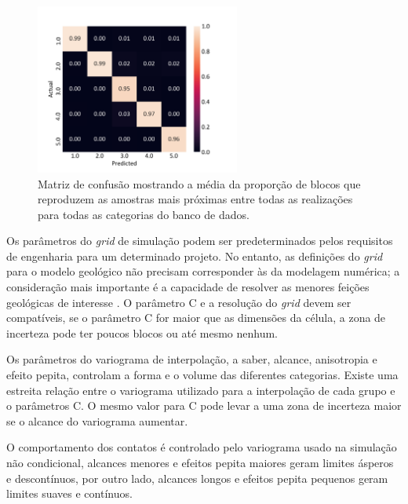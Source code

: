 \begin{figure}[H]
	\caption{\label{fig:backflag_bound_hier} Matriz de confusão mostrando a média da proporção de blocos que reproduzem as amostras mais próximas entre todas as realizações para todas as categorias do banco de dados.}
	\centering
		\includegraphics[width=0.6\textwidth]{capitulo_3/imagens/backflag_bound_hier.png}
\end{figure}

Os parâmetros do \textit{grid} de simulação podem ser predeterminados pelos requisitos de engenharia para um determinado projeto. No entanto, as definições do \textit{grid} para o modelo geológico não precisam corresponder às da modelagem numérica; a consideração mais importante é a capacidade de resolver as menores feições geológicas de interesse \cite{martin}. O parâmetro C e a resolução do \textit{grid} devem ser compatíveis, se o parâmetro C for maior que as dimensões da célula, a zona de incerteza pode ter poucos blocos ou até mesmo nenhum.

Os parâmetros do variograma de interpolação, a saber, alcance, anisotropia e efeito pepita, controlam a forma e o volume das diferentes categorias. Existe uma estreita relação entre o variograma utilizado para a interpolação de cada grupo e o parâmetros C. O mesmo valor para C pode levar a uma zona de incerteza maior se o alcance do variograma aumentar.

O comportamento dos contatos é controlado pelo variograma usado na simulação não condicional, alcances menores e efeitos pepita maiores geram limites ásperos e descontínuos, por outro lado, alcances longos e efeitos pepita pequenos geram limites suaves e contínuos.

